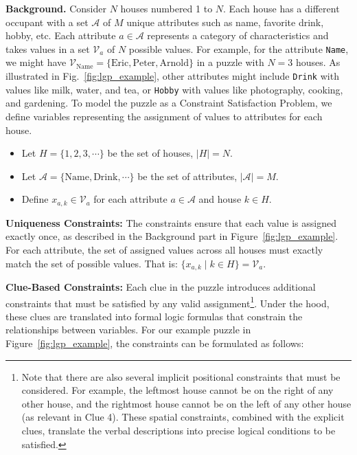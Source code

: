 \textbf{Background.} Consider $N$ houses numbered 1 to $N$. Each house has a different occupant with a set $\mathcal{A}$ of $M$ unique attributes such as name, favorite drink, hobby, etc. Each attribute $a \in \mathcal{A}$ represents a category of characteristics and takes values in a set $\mathcal{V}_a$ of $N$ possible values. 
For example, for the attribute \texttt{Name}, we might have $\mathcal{V}_{\text{Name}} = \{ \text{Eric},\text{Peter},\text{Arnold} \}$ in a puzzle with $N=3$ houses. 
As illustrated in Fig.~\ref{fig:lgp_example}, other attributes might include \texttt{Drink} with values like milk, water, and tea, or \texttt{Hobby} with values like photography, cooking, and gardening.
To model the puzzle as a Constraint Satisfaction Problem, we define variables representing the assignment of values to attributes for each house.


\vspace{-0.2cm}
\begin{itemize}[noitemsep,topsep=0pt,leftmargin=1em]
    \small 
    \item Let $H = \{1, 2, 3, \cdots\}$ be the set of houses, $|H| = N$.
    \item Let $\mathcal{A} = \{\text{Name}, \text{Drink}, \cdots \}$ be the set of attributes, $|\mathcal{A}| = M$.
    \item Define $x_{a,k} \in \mathcal{V}_{a}$ for each attribute $a \in \mathcal{A}$ and house $k \in H$.
\end{itemize}
\vspace{-0.2cm}
 


\textbf{Uniqueness Constraints:}
The constraints ensure that each value is assigned exactly once, as described in the Background part in Figure~\ref{fig:lgp_example}.
For each attribute, the set of assigned values across all houses must exactly match the set of possible values. That is:  $\{ x_{a, k} \mid k \in H \} = \mathcal{V}_{a}$.




\textbf{Clue-Based Constraints:} 
Each clue in the puzzle introduces additional constraints that must be satisfied by any valid assignment\footnote{Note that there are also several implicit positional constraints that must be considered. For example, the leftmost house cannot be on the right of any other house, and the rightmost house cannot be on the left of any other house (as relevant in Clue 4). These spatial constraints, combined with the explicit clues, translate the verbal descriptions into precise logical conditions to be satisfied.}. Under the hood, these clues are translated into formal logic formulas that constrain the relationships between variables. For our example puzzle in Figure~\ref{fig:lgp_example}, the constraints can be formulated as follows:

